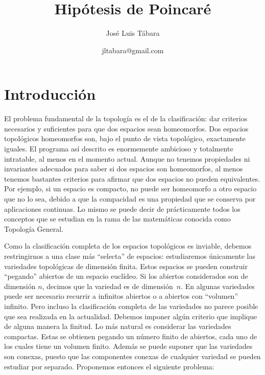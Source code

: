 \documentclass[a4paper, 12pt]{article}
\title{Hipótesis de Poincaré}
\author{José Luis Tábara}
\date{jltabara@gmail.com}
\begin{document}
\begin{tcolorbox}[colback=red!5!white,colframe=red!75!black]

\vspace{-1cm}
\maketitle

\end{tcolorbox}

\thispagestyle{empty}

\tableofcontents

\newpage

\section*{Introducción}\setcounter{page}{1}

 El problema fundamental de la topología es el de la clasificación: dar criterios necesarios y suficientes para que dos espacios sean homeomorfos. Dos espacios topológicos  homeomorfos son, bajo el punto de vista topológico, exactamente iguales.   El programa así descrito es enormemente ambicioso y totalmente intratable, al menos en el momento actual. Aunque no tenemos propiedades  ni invariantes adecuados para saber si dos espacios son homeomorfos, al menos tenemos bastantes criterios para afirmar  que dos espacios no pueden equivalentes. Por ejemplo, si un espacio es compacto, no puede ser homeomorfo a otro espacio que no lo sea, debido a que la compacidad es una propiedad que se conserva por aplicaciones continuas. Lo mismo se puede decir de prácticamente todos los conceptos que se estudian en la rama de las matemáticas conocida como  Topología General.  

Como la clasificación completa de los espacios topológicos es inviable, debemos restringirnos a una clase más ``selecta'' de espacios: estudiaremos únicamente las variedades topológicas de dimensión finita. Estos espacios se pueden construir ``pegando'' abiertos de un espacio euclídeo.  Si los abiertos considerados son de dimensión $n$, decimos que la variedad es de dimensión~$n$.  En algunas variedades puede ser necesario recurrir a infinitos abiertos o a abiertos con ``volumen'' infinito. Pero incluso la clasificación completa de las variedades no parece posible que sea realizada en la actualidad.  Debemos imponer algún criterio que implique de alguna manera la finitud.  Lo más natural es considerar las variedades compactas. Estas se obtienen pegando un número finito de abiertos, cada uno de los cuales tiene un volumen finito. Además se puede suponer que las variedades son conexas, puesto que las componentes conexas de cualquier variedad se pueden estudiar por separado.  Proponemos entonces el siguiente problema:
\end{document}
